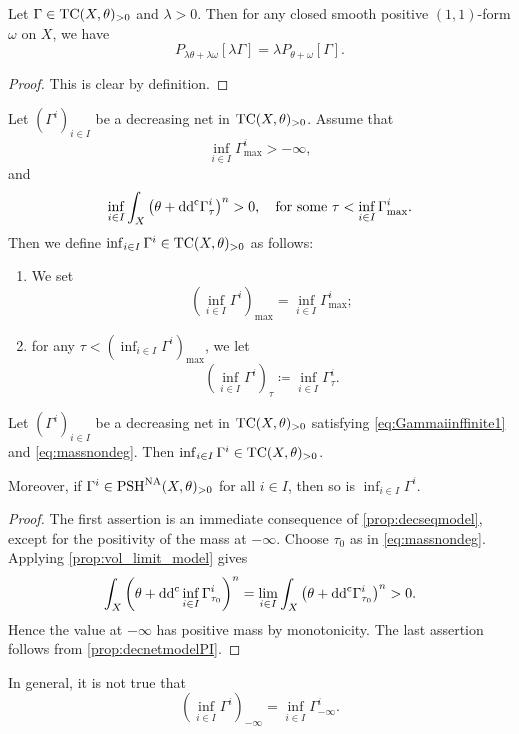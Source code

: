 \begin{lemma}\label{lma:testcurvrescompatible}
    Let $\Gamma\in \mathrm{TC}(X,\theta)_{>0}$ and $\lambda>0$. Then for any closed smooth positive $(1,1)$-form $\omega$ on $X$, we have
    \[
    P_{\lambda\theta+\lambda\omega}[\lambda\Gamma]=\lambda P_{\theta+\omega}[\Gamma].
    \]
\end{lemma}
\begin{proof}
    This is clear by definition.
\end{proof}

\begin{definition}\label{def:testcurinf}
    Let $(\Gamma^i)_{i\in I}$ be a decreasing net in $\mathrm{TC}(X,\theta)_{>0}$. Assume that
    \begin{equation}\label{eq:Gammaiinffinite1}
        \inf_{i\in I}\Gamma^{i}_{\max}>-\infty,
    \end{equation}
    and
    \begin{equation}\label{eq:massnondeg}
    \inf_{i\in I} \int_X \left( \theta+\mathrm{dd}^{\mathrm{c}} \Gamma^i_{\tau} \right)^n>0,\quad \textup{for some }\tau< \inf_{i\in I}\Gamma^{i}_{\max}.
    \end{equation}
    Then we define $\inf_{i\in I} \Gamma^{i}\in \mathrm{TC}(X,\theta)_{>0}$ as follows:
    \begin{enumerate}
        \item\label{itm:def:testcurinf:1} We set
        \[
            \left( \inf_{i\in I} \Gamma^{i} \right)_{\max}=\inf_{i\in I}\Gamma^{i}_{\max};
        \]
        \item\label{itm:def:testcurinf:2} for any $\tau<  \left( \inf_{i\in I} \Gamma^{i} \right)_{\max}$, we let
        \[
        \left( \inf_{i\in I} \Gamma^{i} \right)_{\tau}\coloneqq \inf_{i\in I} \Gamma^{i}_{\tau}.
        \]
    \end{enumerate}
\end{definition}

\begin{proposition}\label{prop:inftcistc}
    Let $(\Gamma^i)_{i\in I}$ be a decreasing net in $\mathrm{TC}(X,\theta)_{>0}$ satisfying \eqref{eq:Gammaiinffinite1} and \eqref{eq:massnondeg}. Then $\inf_{i\in I} \Gamma^{i}\in \mathrm{TC}(X,\theta)_{>0}$.

    Moreover, if $\Gamma^i\in \mathrm{PSH}^{\mathrm{NA}}(X,\theta)_{>0}$ for all $i\in I$, then so is $\inf_{i\in I} \Gamma^{i}$.
\end{proposition}
\begin{proof}
    The first assertion is an immediate consequence of \cref{prop:decseqmodel}, except for the positivity of the mass at $-\infty$. Choose $\tau_0$ as in \eqref{eq:massnondeg}. Applying \cref{prop:vol_limit_model} gives
    \[
        \int_X \left(\theta+\mathrm{dd}^{\mathrm{c}}\inf_{i\in I}\Gamma^i_{\tau_0}\right)^n
        =\lim_{i\in I}\int_X\left(\theta+\mathrm{dd}^{\mathrm{c}}\Gamma^{i}_{\tau_0}\right)^n>0.
    \]
    Hence the value at $-\infty$ has positive mass by monotonicity. The last assertion follows from \cref{prop:decnetmodelPI}.
\end{proof}
In general, it is not true that
\[
\left( \inf_{i\in I}\Gamma^{i} \right)_{-\infty}=\inf_{i\in I}\Gamma^{i}_{-\infty}.
\]

